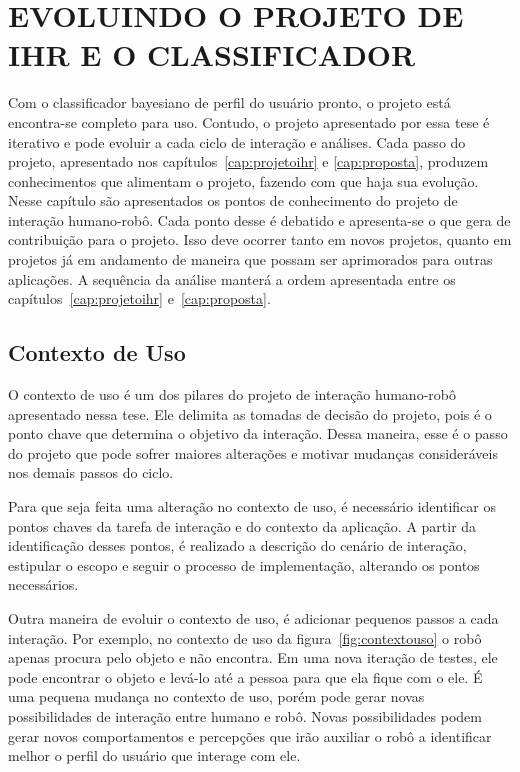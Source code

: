 \chapter{EVOLUINDO O PROJETO DE IHR E O CLASSIFICADOR}
\label{cap:evolucao}
Com o classificador bayesiano de perfil do usuário pronto, o projeto está encontra-se completo para uso. Contudo, o projeto apresentado por essa tese é iterativo e pode evoluir a cada ciclo de interação e análises. Cada passo do projeto, apresentado nos capítulos~\ref{cap:projetoihr} e \ref{cap:proposta}, produzem conhecimentos que alimentam o projeto, fazendo com que haja sua evolução. Nesse capítulo são apresentados os pontos de conhecimento do projeto de interação humano-robô. Cada ponto desse é debatido e apresenta-se o que gera de contribuição para o projeto. Isso deve ocorrer tanto em novos projetos, quanto em projetos já em andamento de maneira que possam ser aprimorados para outras aplicações. A sequência da análise manterá a ordem apresentada entre os capítulos~\ref{cap:projetoihr} e~\ref{cap:proposta}.

\section{Contexto de Uso}
\label{sec:contextouso2}
O contexto de uso é um dos pilares do projeto de interação humano-robô apresentado nessa tese. Ele delimita as tomadas de decisão do projeto, pois é o ponto chave que determina o objetivo da interação. Dessa maneira, esse é o passo do projeto que pode sofrer maiores alterações e motivar mudanças consideráveis nos demais passos do ciclo.

Para que seja feita uma alteração no contexto de uso, é necessário identificar os pontos chaves da tarefa de interação e do contexto da aplicação. A partir da identificação desses pontos, é realizado a descrição do cenário de interação, estipular o escopo e seguir o processo de implementação, alterando os pontos necessários.

Outra maneira de evoluir o contexto de uso, é adicionar pequenos passos a cada interação. Por exemplo, no contexto de uso da figura~\ref{fig:contextouso} o robô apenas procura pelo objeto e não encontra. Em uma nova iteração de testes, ele pode encontrar o objeto e levá-lo até a pessoa para que ela fique com o ele. É uma pequena mudança no contexto de uso, porém pode gerar novas possibilidades de interação entre humano e robô. Novas possibilidades podem gerar novos comportamentos e percepções que irão auxiliar o robô a identificar melhor o perfil do usuário que interage com ele.

